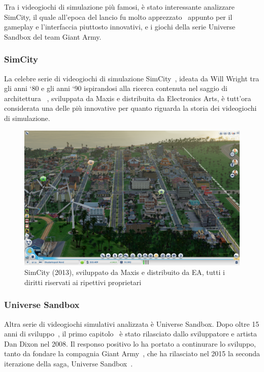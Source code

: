             Tra i videogiochi di simulazione più famosi, è stato interessante analizzare SimCity, il quale all'epoca del lancio fu molto apprezzato~\cite{friedman1995} appunto per il gameplay e l'interfaccia piuttosto innovativi, e i giochi della serie Universe Sandbox del team Giant Army.

            \subsubsection{SimCity}\label{subsub:simcity}
                La celebre serie di videogiochi di simulazione SimCity~\cite{simcity}, ideata da Will Wright tra gli anni `80 e gli anni `90 ispirandosi alla ricerca contenuta nel saggio di architettura ~\cite{wiredWright, aPatternLanguage}, sviluppata da Maxis e distribuita da Electronics Arts, è tutt'ora considerata una delle più innovative per quanto riguarda la storia dei videogiochi di simulazione.

                \begin{figure}[htbp]
                    \centering
                    \includegraphics[scale=0.2]{img/SimCity}
                    \caption{SimCity (2013), sviluppato da Maxis e distribuito da EA, tutti i diritti riservati ai ripettivi proprietari}
                    \label{fig:simcity}
                \end{figure}


            \subsubsection{Universe Sandbox}\label{subsub:universesandbox}
                Altra serie di videogiochi simulativi analizzata è Universe Sandbox.
                Dopo oltre 15 anni di sviluppo~\cite{unisandTechradar}, il primo capitolo~\cite{universeSandboxDixon} è stato rilasciato dallo sviluppatore e artista Dan Dixon nel 2008.
                Il responso positivo lo ha portato a continurare lo sviluppo, tanto da fondare la compagnia Giant Army~\cite{universeSandboxGiantArmy}, che ha rilasciato nel 2015 la seconda iterazione della saga, Universe Sandbox~\cite{universeSandbox2}.

